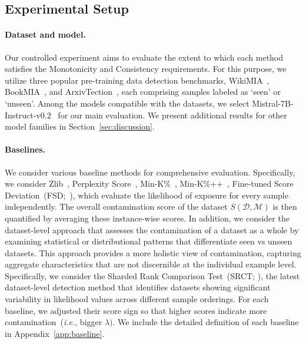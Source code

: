 \subsection{Experimental Setup}
\label{sec:es}




\paragraph{Dataset and model.}
Our controlled experiment aims to evaluate the extent to which each method satisfies the Monotonicity and Consistency requirements. 
For this purpose, we utilize three popular pre-training data detection benchmarks, WikiMIA~\cite{shidetecting}, BookMIA~\cite{shidetecting}, and ArxivTection~\cite{duarte2024decop}, each comprising samples labeled as `seen' or `unseen'.
Among the models compatible with the datasets, we select Mistral-7B-Instruct-v0.2~\cite{jiang2023mistral} for our main evaluation. We present additional results for other model families in Section~\ref{sec:discussion}.


\paragraph{Baselines.}
We consider various baseline methods for comprehensive evaluation.
Specifically, we consider Zlib~\cite{carlini2021extracting}, Perplexity Score~\cite{li2023estimating}, Min-K\%~\cite{shidetecting}, Min-K\%++~\cite{zhang2024min}, Fine-tuned Score Deviation~(FSD;~\citet{zhang2024fine}), which evaluate the likelihood of exposure for every sample independently. The overall contamination score of the dataset $S(\mathcal{D}, \mathcal{M})$ is then quantified by averaging these instance-wise scores. In addition, we consider the dataset-level approach that assesses the contamination of a dataset as a whole by examining statistical or distributional patterns that differentiate seen vs unseen datasets. This approach provides a more holistic view of contamination, capturing aggregate characteristics that are not discernible at the individual example level. Specifically, we consider the Sharded Rank Comparison Test~(SRCT; \citet{orenproving}), the latest dataset-level detection method that identifies datasets showing significant variability in likelihood values across different sample orderings.
For each baseline, we adjusted their score sign so that higher scores indicate more contamination~(\textit{i.e.}, bigger $\lambda).$ We include the detailed definition of each baseline in Appendix~\ref{app:baseline}.


